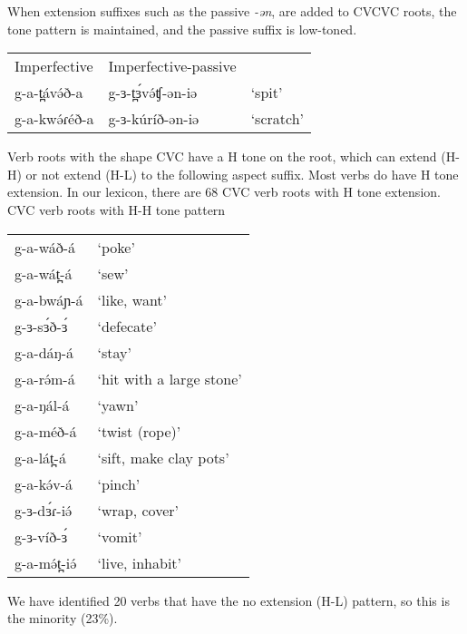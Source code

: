 When extension suffixes such as the passive \textit{-ən}, are added to CVCVC roots, the tone pattern is maintained, and the passive suffix is low-toned. %
\ea 
\begin{tabular}[t]{lll}
Imperfective	&	Imperfective-passive	\\
g-a-t̪ávə́ð-a	&	g-ɜ-t̪ɜ́və́ʧ-ən-iə	&	‘spit’\\
g-a-kwə́ɾéð-a	&	g-ɜ-kúríð-ən-iə	&	‘scratch’ \\	
\end{tabular}
\z 


Verb roots with the shape CVC have a H tone on the root, which can extend (H-H) or not extend (H-L) to the following aspect suffix. Most verbs do have H tone extension. In our lexicon, there are 68 CVC verb roots with H tone extension.
\ea CVC verb roots with H-H tone pattern
\begin{tabular}[t]{ll}
g-a-wáð-á	&	‘poke’\\
g-a-wát̪-á	&	‘sew’\\
g-a-bwáɲ-á	&	‘like, want'\\
g-ɜ-sɜ́ð-ɜ́	&	‘defecate’\\
g-a-dáŋ-á	&	‘stay’\\
g-a-rə́m-á	&	‘hit with a large stone’\\
g-a-ŋál-á	&	‘yawn’\\
g-a-méð-á	&	‘twist (rope)’\\
g-a-lát̪-á	&	‘sift, make clay pots’\\
g-a-kə́v-á	&	‘pinch’\\
g-ɜ-dɜ́ɾ-iə́	&	‘wrap, cover’\\
g-ɜ-víð-ɜ́	&	‘vomit’\\
g-a-mə́t̪-iə́	&	‘live, inhabit’\\ 
\end{tabular}
\z 
We have identified 20 verbs that have the no extension (H-L) pattern, so this is the minority (23\%). 

